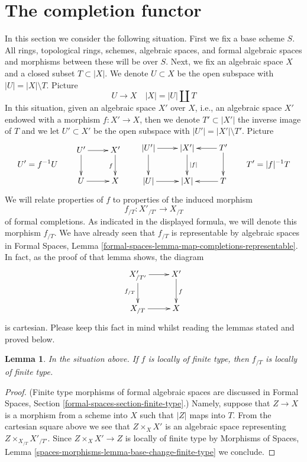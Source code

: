 \documentclass{stacks-project}
\theoremstyle{plain}
\newtheorem{lemma}[subsection]{Lemma}
\theoremstyle{definition}
\theoremstyle{remark}
\numberwithin{equation}{subsection}
\begin{document}
\section{The completion functor}
\label{section-completion-functor}

\noindent
In this section we consider the following situation.
First we fix a base scheme $S$. All rings, topological rings,
schemes, algebraic spaces, and formal algebraic spaces and
morphisms between these will be over $S$. Next, we fix an
algebraic space $X$ and a closed subset $T \subset |X|$.
We denote $U \subset X$ be the open subspace with $|U| = |X| \setminus T$.
Picture
$$
U \to X \quad |X| = |U| \amalg T
$$
In this situation, given an algebraic space $X'$ over $X$, i.e., an
algebraic space $X'$ endowed with a morphism $f : X' \to X$, then we
denote $T' \subset |X'|$ the inverse image of $T$ and we let $U' \subset X'$
be the open subspace with $|U'| = |X'| \setminus T'$. Picture
$$
U' = f^{-1}U
\quad\quad
\vcenter{
\xymatrix{
U' \ar[d] \ar[r] & X' \ar[d]_f \\
U \ar[r] & X
}
}
\quad\quad
\vcenter{
\xymatrix{
|U'| \ar[r] \ar[d] & |X'| \ar[d]^{|f|} & T' \ar[l] \ar[d] \\
|U| \ar[r] & |X| & T \ar[l]
}
}
\quad\quad
T' = |f|^{-1}T
$$
We will relate properties of $f$ to properties of the induced morphism
$$
f_{/T} : X'_{/T'} \longrightarrow X_{/T}
$$
of formal completions. As indicated in the displayed formula, we will
denote this morphism $f_{/T}$. We have already seen that
$f_{/T}$ is representable by algebraic spaces in
Formal Spaces, Lemma
\ref{formal-spaces-lemma-map-completions-representable}.
In fact, as the proof of that lemma shows, the diagram
$$
\xymatrix{
X'_{/T'} \ar[d]_{f_{/T}} \ar[r] & X' \ar[d]^f \\
X_{/T} \ar[r] & X
}
$$
is cartesian. Please keep this fact in mind whilst reading the lemmas stated
and proved below.

\begin{lemma}
\label{lemma-map-completions-finite-type}
In the situation above. If $f$ is locally of finite type, then
$f_{/T}$ is locally of finite type.
\end{lemma}

\begin{proof}
(Finite type morphisms of formal algebraic spaces are discussed in
Formal Spaces, Section \ref{formal-spaces-section-finite-type}.)
Namely, suppose that $Z \to X$ is a morphism from a scheme into $X$ such
that $|Z|$ maps into $T$. From the cartesian square above we see that
$Z \times_X X'$ is an algebraic space representing
$Z \times_{X_{/T}} X'_{/T'}$. Since $Z \times_X X' \to Z$
is locally of finite type by Morphisms of Spaces, Lemma
\ref{spaces-morphisms-lemma-base-change-finite-type} we conclude.
\end{proof}
\end{document}

